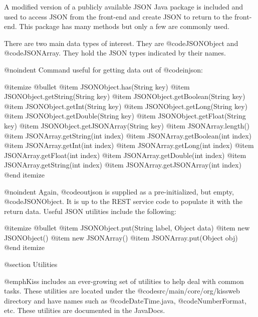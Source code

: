 A modified version of a publicly available JSON Java package is
included and used to access JSON from the front-end and create JSON to
return to the front-end.  This package has many methods but only a few are
commonly used.

There are two main data types of interest.  They are @code{JSONObject} and
@code{JSONArray}.  They hold the JSON types indicated by their names.

@noindent
Command useful for getting data out of @code{injson}:

@itemize @bullet
@item
JSONObject.has(String key)
@item
JSONObject.getString(String key)
@item
JSONObject.getBoolean(String key)
@item
JSONObject.getInt(String key)
@item
JSONObject.getLong(String key)
@item
JSONObject.getDouble(String key)
@item
JSONObject.getFloat(String key)
@item
JSONObject.getJSONArray(String key)
@item
JSONArray.length()
@item
JSONArray.getString(int index)
@item
JSONArray.getBoolean(int index)
@item
JSONArray.getInt(int index)
@item
JSONArray.getLong(int index)
@item
JSONArray.getFloat(int index)
@item
JSONArray.getDouble(int index)
@item
JSONArray.getString(int index)
@item
JSONArray.getJSONArray(int index)
@end itemize

@noindent
Again, @code{outjson} is supplied as a pre-initialized, but empty,
@code{JSONObject}.  It is up to the REST service code to populate it
with the return data.  Useful JSON utilities include the following:

@itemize @bullet
@item
JSONObject.put(String label, Object data)
@item
new JSONObject()
@item
new JSONArray()
@item
JSONArray.put(Object obj)
@end itemize


@section Utilities

@emph{Kiss} includes an ever-growing set of utilities to help deal with common tasks.
These utilities are located under the @code{src/main/core/org/kissweb} directory and have names such as
@code{DateTime.java}, @code{NumberFormat}, etc.  These utilities
are documented in the JavaDocs.
